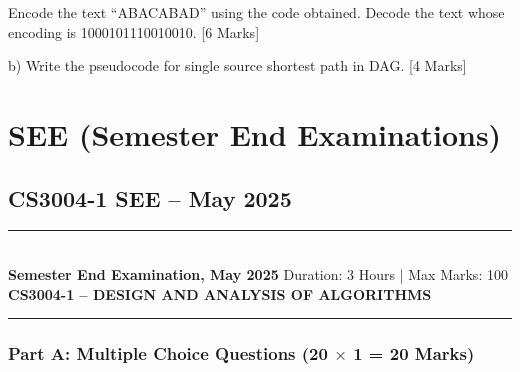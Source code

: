 \documentclass[11pt,a4paper]{article}
\newcommand{\examheader}[4]{
\noindent\rule{\textwidth}{0.5pt}\\
\textbf{#1} \hfill Duration: #3 | Max Marks: #4\\
\textbf{#2}\\
\rule{\textwidth}{0.5pt}
\vspace{0.2cm}
}
\begin{document}
Encode the text ``ABACABAD'' using the code obtained. Decode the text whose encoding is 1000101110010010. \hfill [6 Marks]

b) Write the pseudocode for single source shortest path in DAG. \hfill [4 Marks]

\section{SEE (Semester End Examinations)}

\subsection{CS3004-1 SEE -- May 2025}
\examheader{Semester End Examination, May 2025}{CS3004-1 -- DESIGN AND ANALYSIS OF ALGORITHMS}{3 Hours}{100}

\subsubsection*{Part A: Multiple Choice Questions (20 $\times$ 1 = 20 Marks)}
\end{document}
